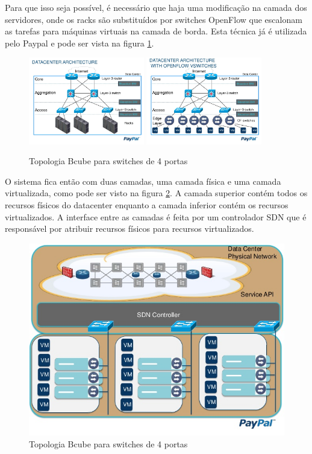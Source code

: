 \documentclass[12pt,a4paper]{report}
\begin{document}
Para que isso seja possível, é necessário que haja uma modificação na camada dos servidores, onde os racks são substituídos por switches OpenFlow que escalonam as tarefas para máquinas virtuais na camada de borda. Esta técnica já é utilizada pelo Paypal e pode ser vista na figura \ref{paypal}.\\

\begin{figure}[H]
\centering
\includegraphics[width=0.45\textwidth]{imagens/sdn-1.jpg}
\includegraphics[width=0.45\textwidth]{imagens/sdn-2.jpg}
\caption{Topologia Bcube para switches de 4 portas}
\label{paypal}
\end{figure}

O sistema fica então com duas camadas, uma camada física e uma camada virtualizada, como pode ser visto na figura \ref{sdn2}. A camada superior contém todos os recursos físicos do datacenter enquanto a camada inferior contém os recursos virtualizados. A interface entre as camadas é feita por um controlador SDN que é responsável por atribuir recursos físicos para recursos virtualizados.\\

\begin{figure}[H]
\centering
\includegraphics[width=.8\textwidth]{imagens/sdn-3.jpg}
\caption{Topologia Bcube para switches de 4 portas}
\label{sdn2}
\end{figure}
\end{document}
